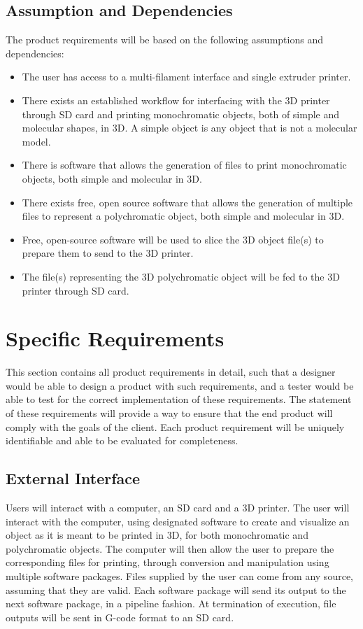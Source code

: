 \documentclass[letterpaper, onecolumn, draftclsnofoot, 10pt, compsoc]{IEEEtran}
\begin{document}
\subsection{Assumption and Dependencies} %
The product requirements will be based on the following assumptions and dependencies: 
\begin{itemize}
 \item The user has access to a multi-filament interface and single extruder printer.
  \item There exists an established workflow for interfacing with the 3D printer through SD card and printing monochromatic objects, both of simple and molecular shapes, in 3D. 
  A simple object is any object that is not a molecular model.
  \item There is software that allows the generation of files to print monochromatic objects, both simple and molecular in 3D.
  \item There exists free, open source software that allows the generation of multiple files to represent a polychromatic object, both simple and molecular in 3D.
  \item Free, open-source software will be used to slice the 3D object file(s) to prepare them to send to the 3D printer. 
  \item The file(s) representing the 3D polychromatic object will be fed to the 3D printer through SD card. 
\end{itemize}

\section{Specific Requirements} %
This section contains all product requirements in detail, such that a designer would be able to design a product with such requirements, and a tester would be able to test for the correct implementation of these requirements. 
The statement of these requirements will provide a way to ensure that the end product will comply with the goals of the client. 
Each product requirement will be uniquely identifiable and able to be evaluated for completeness. 
	
    \subsection{External Interface}
   	Users will interact with a computer, an SD card and a 3D printer. 
     The user will interact with the computer, using designated software to create and visualize an object as it is meant to be printed in 3D, for both monochromatic and polychromatic objects. 
    The computer will then allow the user to prepare the corresponding files for printing, through conversion and manipulation using multiple software packages.
    Files supplied by the user can come from any source, assuming that they are valid. 
    Each software package will send its output to the next software package, in a pipeline fashion.
    At termination of execution, file outputs will be sent in G-code format to an SD card.
    
\end{document}
